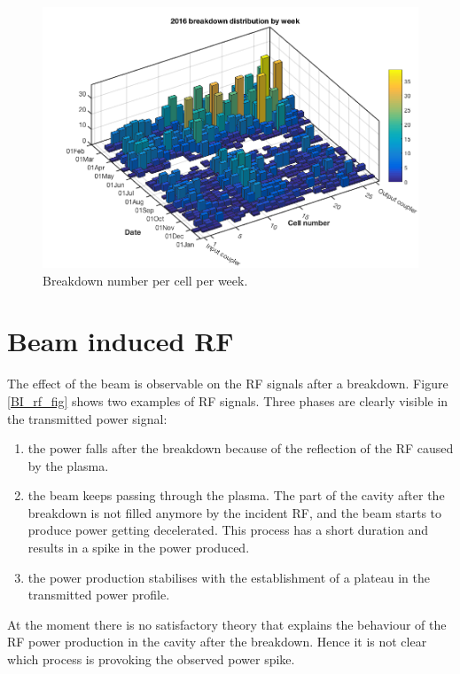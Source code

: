 \begin{figure}[h]
\centering 
\includegraphics[scale=0.4]{pictures/week_distr_3D.png}
\caption{Breakdown number per cell per week. }
\label{BD_3d}
\end{figure}









\section[Beam induced RF]{Beam induced RF}

The effect of the beam is observable on the RF signals after a breakdown. Figure \ref{BI_rf_fig}  shows two examples of RF signals. Three phases are clearly visible in the transmitted power signal: 
\begin{enumerate}
\item the power falls after the breakdown because of the reflection of the RF caused by the plasma.
\item the beam keeps passing through the plasma. The part of the cavity after the breakdown is not filled anymore by the incident RF, and the beam starts to produce power getting decelerated. This process has a short duration and results in a spike in the power produced. 
\item the power production stabilises with the establishment of a plateau in the transmitted power profile.
\end{enumerate}
At the moment there is no satisfactory theory that explains the behaviour of the RF power production in the cavity after the breakdown. Hence it is not clear which process is provoking the observed power spike.

